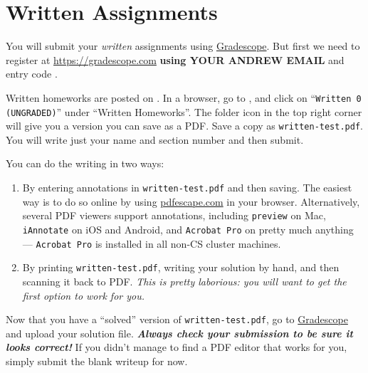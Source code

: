 \newpage
\section*{Written Assignments}

\begin{part}
  You will submit your \emph{written} assignments using
  \href{\gradescope}{Gradescope}.  But first we need to register at
  \url{https://gradescope.com} \textbf{using YOUR ANDREW EMAIL} and
  entry code \textbf{\gradescopeEntryCode}.

Written homeworks are posted on \writtenDistributor{}.  In a browser,
go to \writtenDistributor{}, and click on \linebreak%
``\lstinline'Written 0 (UNGRADED)''' under ``Written Homeworks''.  %
The folder icon in the top
right corner will give you a version you can save as a PDF\@.  Save a
copy as \lstinline'written-test.pdf'.  You will write just your name
and section number and then submit.

You can do the writing in two ways:
\begin{enumerate}
\item%
  By entering annotations in \lstinline'written-test.pdf' and then
  saving.  The easiest way is to do so online by using
  \url{pdfescape.com} in your browser.  Alternatively, several
  PDF viewers support annotations, including
  \lstinline'preview' on Mac, \lstinline'iAnnotate' on iOS and
  Android, and \lstinline'Acrobat Pro' on pretty much anything ---
  \lstinline'Acrobat Pro' is installed in all non-CS cluster machines.

\item%
  By printing \lstinline'written-test.pdf', writing your solution by
  hand, and then scanning it back to PDF\@.  \emph{This is pretty
    laborious: you will want to get the first option to work for you.}
\end{enumerate}

Now that you have a ``solved'' version of
\lstinline'written-test.pdf', go to \href{\gradescope}{Gradescope} and
upload your solution file.  \textbf{\em Always check your submission
  to be sure it looks correct!}  If you didn't manage to find a PDF
editor that works for you, simply submit the blank writeup for now.
\end{part}
\chkptC